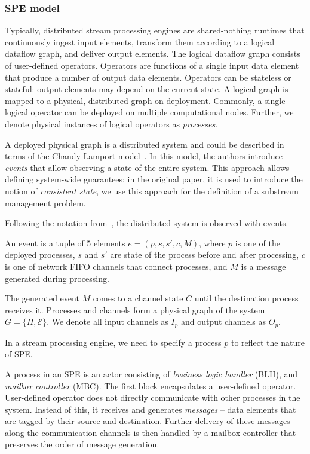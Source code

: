 \subsubsection{SPE model}
\label{fs-acker-spe-model}

Typically, distributed stream processing engines are shared-nothing runtimes that continuously ingest input elements, transform them according to a logical dataflow graph, and deliver output elements. The logical dataflow graph consists of user-defined operators. Operators are functions of a single input data element that produce a number of output data elements. Operators can be stateless or stateful: output elements may depend on the current state. A logical graph is mapped to a physical, distributed graph on deployment. Commonly, a single logical operator can be deployed on multiple computational nodes. Further, we denote physical instances of logical operators as {\em processes}.

A deployed physical graph is a distributed system and could be described in terms of the Chandy-Lamport model~\cite{Chandy:1985:DSD:214451.214456, carbone2018scalable}. In this model, the authors introduce \textit{events} that allow observing a state of the entire system. This approach allows defining system-wide guarantees: in the original paper, it is used to introduce the notion of {\em consistent state}, we use this approach for the definition of a substream management problem.

Following the notation from~\cite{Chandy:1985:DSD:214451.214456, carbone2018scalable}, the distributed system is observed with events. 

\begin{definition}[Event]
An event is a tuple of 5 elements $e = (p, s, s', c, M)$, where $p$ is one of the deployed processes, $s$ and $s'$ are state of the process before and after processing, $c$ is one of network FIFO channels that connect processes, and $M$ is a message generated during processing.
\end{definition}

The generated event $M$ comes to a channel state $C$ until the destination process receives it. Processes and channels form a physical graph of the system $G=\{\Pi,\mathcal{E}\}$. We denote all input channels as $I_p$ and output channels as $O_p$.

In a stream processing engine, we need to specify a process $p$ to reflect the nature of SPE. 

\begin{definition}[Process]
A process in an SPE is an actor consisting of {\em business logic handler} (BLH), and {\em mailbox controller} (MBC). The first block encapsulates a user-defined operator. User-defined operator does not directly communicate with other processes in the system. Instead of this, it receives and generates {\em messages} -- data elements that are tagged by their source and destination. Further delivery of these messages along the communication channels is then handled by a mailbox controller that preserves the order of message generation.
\end{definition}

